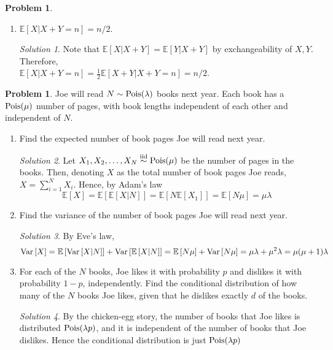 \documentclass[11pt]{article}
\theoremstyle{definition}
\newtheorem{prob}[theo]{\color{Maroon} Problem}
\theoremstyle{remark}
\newtheorem*{soln}{\color{Maroon} Solution}
\newcommand{\E}[1]{\mathbb{E}\left[ #1 \right]}
\renewcommand{\var}[1]{\textnormal{Var}\left[ #1 \right]}
\newcommand{\Pois}{\textnormal{Pois}}
\newcommand{\iidsim}{\overset{\text{iid}}{\sim}}
\begin{document}
\begin{prob}
\begin{enumerate}[label = (\alph*)]
    \dotfill
    
    \item $\E{X|X+Y = n} = n/2 $.
    
    \begin{soln} Note that $\E{X|X+Y} = \E{Y|X+Y}$ by exchangeability of $X,Y$. Therefore, \\ $\E{X|X+Y=n} = \frac{1}{2} \E{X+Y|X+Y=n} = n/2$.
    \end{soln}
    
\end{enumerate}

\end{prob}

\pagebreak

\begin{prob} Joe will read $N \sim \Pois(\lambda)$ books next year. Each book has a $\Pois(\mu)$ number of pages, with book lengths independent of each other and independent of $N$.

\begin{enumerate}[label = (\alph*)]
    \item Find the expected number of book pages Joe will read next year.
    
    \begin{soln} Let $X_1, X_2, \ldots, X_N \iidsim \Pois(\mu)$ be the number of pages in the books. Then, denoting $X$ as the total number of book pages Joe reads, $X = \sum_{i=1}^N X_i$. Hence, by Adam's law $$ \E{X} = \E{\E{X|N}} = \E{N\E{X_1}} = \E{N \mu} = \mu \lambda $$
    \end{soln}
    
    \dotfill
    
    \item Find the variance of the number of book pages Joe will read next year.
    
    \begin{soln} By Eve's law, $$ \var{X} = \E{\var{X|N}} + \var{\E{X|N}} = \E{N\mu} + \var{N\mu} = \mu \lambda + \mu^2 \lambda = \mu(\mu+1)\lambda$$
    \end{soln}
    
    \dotfill
    
    \item For each of the $N$ books, Joe likes it with probability $p$ and dislikes it with probability $1-p$, independently. Find the conditional distribution of how many of the $N$ books Joe likes, given that he dislikes exactly $d$ of the books.
    
    \begin{soln} By the chicken-egg story, the number of books that Joe likes is distributed $\Pois(\lambda p)$, and it is independent of the number of books that Joe dislikes. Hence the conditional distribution is just $\Pois(\lambda p)$
    
    \end{soln}
    
\end{enumerate}

\end{prob}
\end{document}
